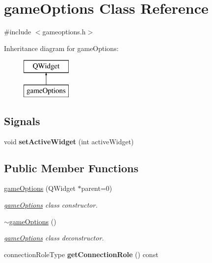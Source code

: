 \hypertarget{classgame_options}{}\section{game\+Options Class Reference}
\label{classgame_options}


{\ttfamily \#include $<$gameoptions.\+h$>$}

Inheritance diagram for game\+Options\+:\begin{figure}[H]
\begin{center}
\leavevmode
\includegraphics[height=2.000000cm]{classgame_options}
\end{center}
\end{figure}
\subsection*{Signals}
\begin{DoxyCompactItemize}
\item 
\mbox{\label{classgame_options_ab3c1e3b2714d32c8c05ebab6392859b5}} 
void {\bfseries set\+Active\+Widget} (int active\+Widget)
\end{DoxyCompactItemize}
\subsection*{Public Member Functions}
\begin{DoxyCompactItemize}
\item 
\mbox{\hyperlink{classgame_options_a2ebd15d680a6cadd61e9cec3d8968677}{game\+Options}} (Q\+Widget $\ast$parent=0)
\begin{DoxyCompactList}\small\item\em \mbox{\hyperlink{classgame_options}{game\+Options}} class constructor. \end{DoxyCompactList}\item 
\mbox{\hyperlink{classgame_options_ae0f5375ed0aa7e83890ae42ee4b512c3}{$\sim$game\+Options}} ()
\begin{DoxyCompactList}\small\item\em \mbox{\hyperlink{classgame_options}{game\+Options}} class deconstructor. \end{DoxyCompactList}\item 
\mbox{\label{classgame_options_a1103c5ad656911a33a12ddd6eee94db8}} 
connection\+Role\+Type {\bfseries get\+Connection\+Role} () const
\end{DoxyCompactItemize}


